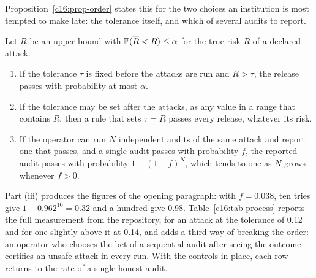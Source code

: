 Proposition~\ref{c16:prop-order} states this for the two choices an institution is
most tempted to make late: the tolerance itself, and which of several audits to
report.

\begin{proposition}\label{c16:prop-order}
Let $\overline{R}$ be an upper bound with $\mathbb{P}(\overline{R} < R) \le \alpha$ for the
true risk $R$ of a declared attack.
\begin{enumerate}
\item[(i)] If the tolerance $\tau$ is fixed before the attacks are run and
$R > \tau$, the release passes with probability at most $\alpha$.
\item[(ii)] If the tolerance may be set after the attacks, as any value in a range
that contains $\overline{R}$, then a rule that sets $\tau = \overline{R}$ passes
every release, whatever its risk.
\item[(iii)] If the operator can run $N$ independent audits of the same attack and
report one that passes, and a single audit passes with probability $f$, the
reported audit passes with probability $1 - (1-f)^N$, which tends to one as $N$
grows whenever $f > 0$.
\end{enumerate}
\end{proposition}

Part (iii) produces the figures of the opening paragraph: with $f = 0.038$, ten tries
give $1 - 0.962^{10} = 0.32$ and a hundred give 0.98. Table~\ref{c16:tab-process}
reports the full measurement from the repository, for an attack at the tolerance of
0.12 and for one slightly above it at 0.14, and adds a third way of breaking the order:
an operator who chooses the bet of a sequential audit after seeing the outcome
certifies an unsafe attack in every run. With the controls in place, each row returns
to the rate of a single honest audit.

